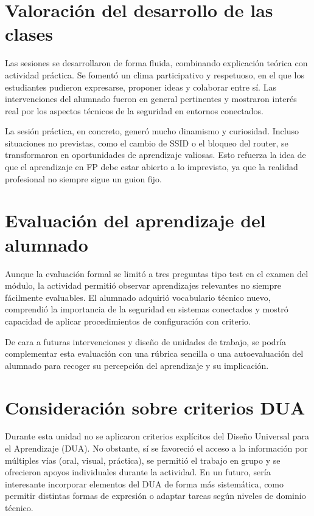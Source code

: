 \section{Valoración del desarrollo de las clases}

Las sesiones se desarrollaron de forma fluida, combinando explicación teórica con actividad práctica. Se fomentó un clima participativo y respetuoso, en el que los estudiantes pudieron expresarse, proponer ideas y colaborar entre sí. Las intervenciones del alumnado fueron en general pertinentes y mostraron interés real por los aspectos técnicos de la seguridad en entornos conectados.

La sesión práctica, en concreto, generó mucho dinamismo y curiosidad. Incluso situaciones no previstas, como el cambio de SSID o el bloqueo del router, se transformaron en oportunidades de aprendizaje valiosas. Esto refuerza la idea de que el aprendizaje en FP debe estar abierto a lo imprevisto, ya que la realidad profesional no siempre sigue un guion fijo.

\section{Evaluación del aprendizaje del alumnado}

Aunque la evaluación formal se limitó a tres preguntas tipo test en el examen del módulo, la actividad permitió observar aprendizajes relevantes no siempre fácilmente evaluables. El alumnado adquirió vocabulario técnico nuevo, comprendió la importancia de la seguridad en sistemas conectados y mostró capacidad de aplicar procedimientos de configuración con criterio.

De cara a futuras intervenciones y diseño de unidades de trabajo, se podría complementar esta evaluación con una rúbrica sencilla o una autoevaluación del alumnado para recoger su percepción del aprendizaje y su implicación.

\section{Consideración sobre criterios DUA}

Durante esta unidad no se aplicaron criterios explícitos del Diseño Universal para el Aprendizaje (DUA). No obstante, sí se favoreció el acceso a la información por múltiples vías (oral, visual, práctica), se permitió el trabajo en grupo y se ofrecieron apoyos individuales durante la actividad. En un futuro, sería interesante incorporar elementos del DUA de forma más sistemática, como permitir distintas formas de expresión o adaptar tareas según niveles de dominio técnico.

